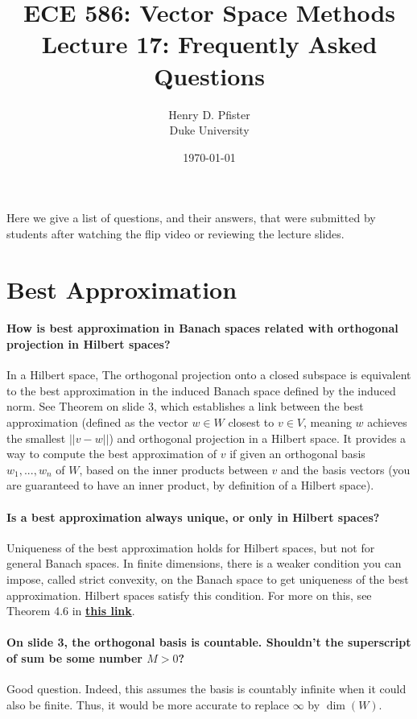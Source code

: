 \documentclass[10pt,english]{article}
\begin{document}
\title{ECE 586: Vector Space Methods \\ Lecture 17: Frequently Asked Questions}
\author{Henry D. Pfister \\ Duke University}
\date{\today}

\maketitle

Here we give a list of questions, and their answers, that were submitted by students after watching the flip video or reviewing the lecture slides.

\section{Best Approximation}
\paragraph{How is best approximation in Banach spaces related with orthogonal projection in Hilbert spaces?}
In a Hilbert space, The orthogonal projection onto a closed subspace is equivalent to the best approximation in the induced Banach space defined by the induced norm.  
See Theorem on slide 3, which establishes a link between the best approximation (defined as the vector $w \in W$ closest to $v\in V$, meaning $w$ achieves the smallest $||v-w||$) and orthogonal projection in a Hilbert space. It provides a way to compute the best approximation of $v$ if given an orthogonal basis $w_1,...,w_n$ of $W$, based on the inner products between $v$ and the basis vectors (you are guaranteed to have an inner product, by definition of a Hilbert space).

\paragraph{Is a best approximation always unique, or only in Hilbert spaces?}
Uniqueness of the best approximation holds for Hilbert spaces, but not for general Banach spaces. In finite dimensions, there is a weaker condition you can impose, called strict convexity, on the Banach space to get uniqueness of the best approximation. Hilbert spaces satisfy this condition. For more on this, see Theorem 4.6 in \href{https://www.damtp.cam.ac.uk/user/na/PartIIIat/b04.pdf}{\textbf{this link}}.

\paragraph{On slide 3, the orthogonal basis is countable. Shouldn't the superscript of sum be some number $M>0$?}
Good question.
Indeed, this assumes the basis is countably infinite when it could also be finite.
Thus, it would be more accurate to replace $\infty$ by $\dim(W)$.
\end{document}
